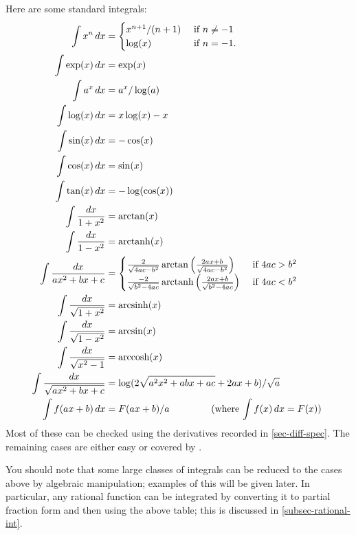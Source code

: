 \documentclass[a4paper]{book}
\theoremstyle{definition}
\begin{document}
Here are some standard integrals:
\begin{align*}
 \int x^n\, dx       &= 
  \begin{cases} x^{n+1}/(n+1) & \text{ if } n\neq -1 \\
                \log(x)       & \text{ if } n = -1.
  \end{cases} \\
 \int \exp(x)\,dx  &= \exp(x) \\
 \int a^x\, dx     &= a^x/\log(a) \\
 \int \log(x)\,dx  &= x\log(x) - x \\
 \int \sin(x)\, dx &= -\cos(x) \\
 \int \cos(x)\, dx &= \sin(x) \\
 \int \tan(x)\, dx &= -\log(\cos(x)) \\
 \int \frac{dx}{1+x^2} &= \arctan(x) \\
 \int \frac{dx}{1-x^2} &= \operatorname{arctanh}(x) \\
 \int \frac{dx}{ax^2+bx+c} &= 
  \begin{cases} \frac{2}{\sqrt{4ac-b^2}}
                \arctan\left(\frac{2ax+b}{\sqrt{4ac-b^2}}\right) &
                 \text{ if } 4ac > b^2 \\
                \frac{-2}{\sqrt{b^2-4ac}}
                \operatorname{arctanh}\left(\frac{2ax+b}{\sqrt{b^2-4ac}}\right) &
                 \text{ if } 4ac < b^2
  \end{cases} \\
 \int \frac{dx}{\sqrt{1+x^2}} &= \operatorname{arcsinh}(x) \\
 \int \frac{dx}{\sqrt{1-x^2}} &= \arcsin(x) \\
 \int \frac{dx}{\sqrt{x^2-1}} &= \operatorname{arccosh}(x) \\
 \int \frac{dx}{\sqrt{ax^2+bx+c}} &=
  \log(2\sqrt{a^2x^2+abx+ac}+2ax+b)/\sqrt{a} \\
 \int f(ax+b)\, dx &= F(ax+b)/a 
                      \hspace{4em}
                      \text{ (where $\int f(x)\,dx=F(x)$) }
\end{align*}
Most of these can be checked using the derivatives recorded in
\autoref{sec-diff-spec}.  The remaining cases are either easy
or covered by .

You should note that some large classes of integrals can be reduced to
the cases above by algebraic manipulation; examples of this will be
given later.  In particular, any rational function can be integrated
by converting it to partial fraction form and then using the above
table; this is discussed in \autoref{subsec-rational-int}.
\end{document}
